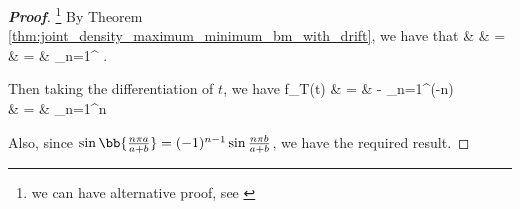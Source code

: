\begin{proof}[\bf Proof]\footnote{we can have alternative proof, see \cite{Douady_1999}}
By Theorem \ref{thm:joint_density_maximum_minimum_bm_with_drift}, we have that
\beast
& & \pro{} = \pro{}\\
& = & \exp{} \sum_{n=1}^\infty  {} \exp {} .
\eeast

Then taking the differentiation of $t$, we have
\beast
f_T(t) & = & -\exp{} \sum_{n=1}^\infty  (-n) \exp {} \\
& = & \exp{} \sum_{n=1}^\infty n \exp {} 
\eeast

Also, since $\sin\bb{\frac{n\pi a}{a+b}} = (-1)^{n-1} \sin\frac{n\pi  b}{a+b}$, we have the required result.
\end{proof}

